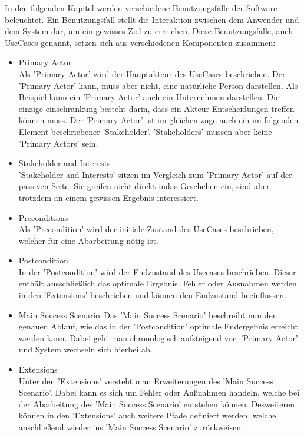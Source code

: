 \documentclass[../../Pflichtenheft.tex]{subfiles}
\begin{document}
In den folgenden Kapitel werden verschiedene Benutzungsfälle der Software beleuchtet.
Ein Benutzungsfall stellt die Interaktion zwischen dem Anwender und dem System dar, um ein gewisses Ziel zu erreichen.
Diese Benutzungsfälle, auch UseCases genannt, setzen sich aus verschiedenen Komponenten zusammen:
    \begin{itemize}
        \item Primary Actor\\
            Als 'Primary Actor' wird der Hauptakteur des UseCases beschrieben.
            Der 'Primary Actor' kann, muss aber nicht, eine natürliche Person darstellen. Als Beispiel kann ein 'Primary Actor' auch
            ein Unternehmen darstellen. Die einzige einschränkung besteht darin, dass ein Akteur Entscheidungen treffen können muss.
            Der 'Primary Actor' ist im gleichen zuge auch ein im folgenden Element beschriebener 'Stakeholder'. 'Stakeholders' müssen
            aber keine 'Primary Actors' sein.
        \item Stakeholder and Interests\\
            'Stakeholder and Interests' sitzen im Vergleich zum 'Primary Actor' auf der passiven Seite. Sie greifen nicht direkt
            indas Geschehen ein, sind aber trotzdem an einem gewissen Ergebnis interessiert.
        \item Preconditions\\
            Als 'Precondition' wird der initiale Zustand des UseCases beschrieben, welcher für eine Abarbeitung nötig ist.
        \item Postcondition\\
            In der 'Postcondition' wird der Endzustand des Usecases beschrieben. Dieser enthält ausschließlich das optimale Ergebnis.
            Fehler oder Ausnahmen werden in den 'Extensions' beschrieben und können den Endzustand beeinflussen.
        \item Main Success Scenario\
            Das 'Main Success Scenario' beschreibt nun den genauen Ablauf, wie das in der 'Postcondition' optimale Endergebnis erreicht werden kann.
            Dabei geht man chronologisch aufsteigend vor. 'Primary Actor' und System wechseln sich hierbei ab.
        \item Extensions\\
            Unter den 'Extensions' versteht man Erweiterungen des 'Main Success Scenario'. Dabei kann es sich um Fehler oder Außnahmen handeln,
            welche bei der Abarbeitung des 'Main Success Scenario' entstehen können. Desweiteren können in den 'Extensions' auch
            weitere Pfade definiert werden, welche anschließend wieder ins 'Main Success Scenario'  zurückweisen.
    \end{itemize}
\end{document}
